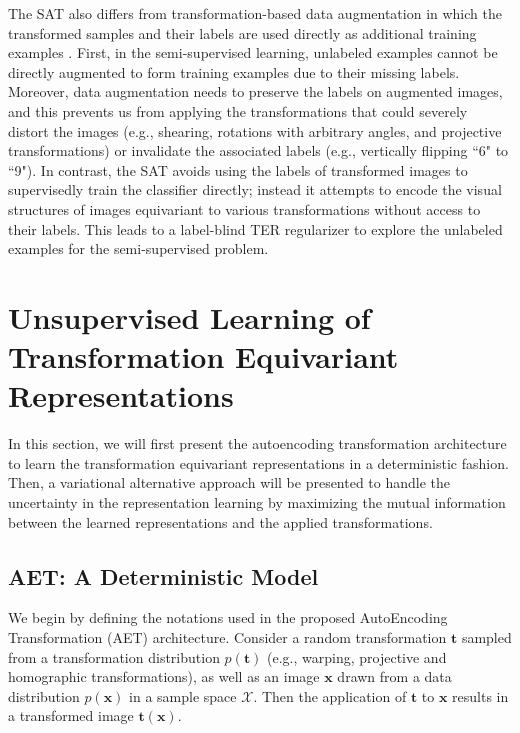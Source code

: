 \documentclass[10pt,journal,compsoc,twoside]{IEEEtran}
\begin{document}
The SAT also differs from transformation-based data augmentation in which the transformed samples and their labels are used directly as additional training examples \cite{krizhevsky2012imagenet}. First, in the semi-supervised learning, unlabeled examples cannot be directly augmented to form training examples due to their missing labels. Moreover, data augmentation needs to preserve the labels on augmented images, and this prevents us from applying the transformations that could severely distort the images (e.g., shearing, rotations with arbitrary angles, and projective transformations) or invalidate the associated labels (e.g., vertically flipping ``6" to ``9").
In contrast, the SAT avoids using the labels of transformed images to supervisedly train the classifier directly; instead it attempts to encode the visual structures of images equivariant to various transformations without access to their labels. This leads to a label-blind TER regularizer to explore the unlabeled examples for the semi-supervised problem.

\section{Unsupervised Learning of Transformation Equivariant Representations}\label{sec:unsup}

In this section, we will first present the autoencoding transformation architecture to learn the transformation equivariant representations in a deterministic fashion. Then, a variational alternative approach will be presented to handle the uncertainty in the representation learning by maximizing the mutual information between the learned representations and the applied transformations.


\subsection{AET: A Deterministic Model}

We begin by defining the notations used in the proposed AutoEncoding Transformation (AET) architecture.
Consider a random transformation $\mathbf t$ sampled from a transformation distribution $p(\mathbf t)$ (e.g., warping, projective and homographic transformations), as well as an image $\mathbf x$ drawn from a data distribution $p(\mathbf x)$ in a sample space $\mathcal X$. Then the application of $\mathbf t$ to $\mathbf x$ results in a transformed image $\mathbf t(\mathbf x)$.
\end{document}
